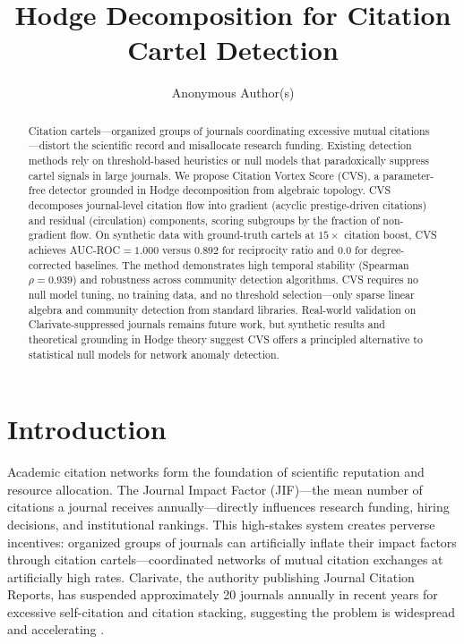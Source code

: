 \documentclass[11pt,letterpaper]{article}
\title{\textbf{Hodge Decomposition for Citation Cartel Detection}}
\author{Anonymous Author(s)}
\date{}
\begin{document}
\maketitle

\begin{abstract}
Citation cartels---organized groups of journals coordinating excessive mutual citations---distort the scientific record and misallocate research funding. Existing detection methods rely on threshold-based heuristics or null models that paradoxically suppress cartel signals in large journals. We propose Citation Vortex Score (CVS), a parameter-free detector grounded in Hodge decomposition from algebraic topology. CVS decomposes journal-level citation flow into gradient (acyclic prestige-driven citations) and residual (circulation) components, scoring subgroups by the fraction of non-gradient flow. On synthetic data with ground-truth cartels at $15\times$ citation boost, CVS achieves AUC-ROC$=1.000$ versus $0.892$ for reciprocity ratio and $0.0$ for degree-corrected baselines. The method demonstrates high temporal stability (Spearman $\rho=0.939$) and robustness across community detection algorithms. CVS requires no null model tuning, no training data, and no threshold selection---only sparse linear algebra and community detection from standard libraries. Real-world validation on Clarivate-suppressed journals remains future work, but synthetic results and theoretical grounding in Hodge theory suggest CVS offers a principled alternative to statistical null models for network anomaly detection.
\end{abstract}

\section{Introduction}

Academic citation networks form the foundation of scientific reputation and resource allocation. The Journal Impact Factor (JIF)---the mean number of citations a journal receives annually---directly influences research funding, hiring decisions, and institutional rankings. This high-stakes system creates perverse incentives: organized groups of journals can artificially inflate their impact factors through citation cartels---coordinated networks of mutual citation exchanges at artificially high rates. Clarivate, the authority publishing Journal Citation Reports, has suspended approximately 20 journals annually in recent years for excessive self-citation and citation stacking, suggesting the problem is widespread and accelerating \citep{Kojaku2021}.
\end{document}
